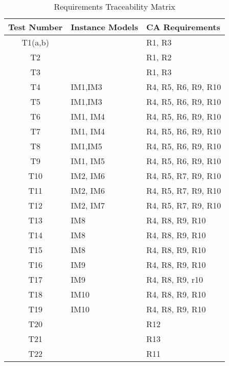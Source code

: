 \documentclass[12pt, titlepage]{article}
\begin{document}
\begin{table} [H]
	\caption{Requirements Traceability Matrix}
	\label{Table:Table_Traceability}  
	\begin{tabular}{|c|p{5cm}|p{5cm}|}
		\hline	
		\textbf{Test Number} & \textbf{Instance Models} & \textbf{CA Requirements}\\
		\hline 
		T1(a,b)&         & R1, R3       \\ \hline
		T2&         & R1, R2       \\ \hline
		T3&         & R1, R3       \\ \hline
		
		T4& IM1,IM3 & R4, R5, R6, R9, R10   \\ \hline
		T5& IM1,IM3& R4, R5, R6, R9, R10   \\ \hline
		
		T6& IM1, IM4& R4, R5, R6, R9, R10   \\ \hline
		T7& IM1, IM4& R4, R5, R6, R9, R10   \\ \hline
		
		T8& IM1,IM5& R4, R5, R6, R9, R10   \\ \hline
		T9& IM1, IM5& R4, R5, R6, R9, R10   \\ \hline
		
		
		T10& IM2, IM6& R4, R5, R7, R9, R10     \\ \hline
		T11& IM2, IM6& R4, R5, R7, R9, R10     \\ \hline
		
		
		T12& IM2, IM7& R4, R5, R7, R9, R10     \\ \hline
		
		
		T13& IM8     & R4, R8, R9, R10  \\ \hline
		T14& IM8     & R4, R8, R9, R10  \\ \hline
		T15& IM8     & R4, R8, R9, R10  \\ \hline
		
		
		T16& IM9     & R4, R8, R9, R10    \\ \hline
		T17& IM9     & R4, R8, R9, r10     \\ \hline
		
		T18& IM10    & R4, R8, R9, R10    \\ \hline
		T19& IM10    & R4, R8, R9, R10    \\ \hline
		
		T20&         & R12\\ \hline
		T21&         & R13\\ \hline
		T22&         & R11\\ \hline
		
	\end{tabular}\\
\end{table}
\end{document}
